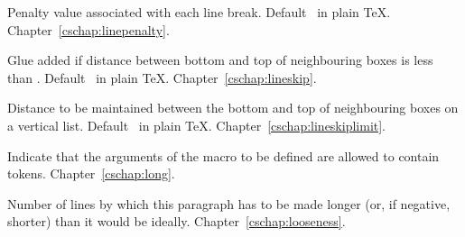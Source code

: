 \begin{glossinventory}
\item [\cs{linepenalty}]
      Penalty value associated with each line break. 
      Default~ in plain \TeX.
Chapter~\ref{cschap:linepenalty}.

\item [\cs{lineskip}] 
      Glue added if distance between bottom and top of neighbouring boxes 
      is less than .
      Default~\n{1pt} in plain \TeX.
Chapter~\ref{cschap:lineskip}.

\item [\cs{lineskiplimit}]
      Distance to be maintained between the bottom and top of 
      neighbouring boxes on a vertical list.
      Default~\n{0pt} in plain \TeX.
Chapter~\ref{cschap:lineskiplimit}.

\item [\cs{long}]
      Indicate that the arguments of the macro to be defined  
      are allowed to contain  tokens.
Chapter~\ref{cschap:long}.

\item [\cs{looseness}] 
      Number of lines by which this paragraph has to be made longer 
      (or, if negative, shorter) than it would be ideally.
Chapter~\ref{cschap:looseness}.


\end{glossinventory}
